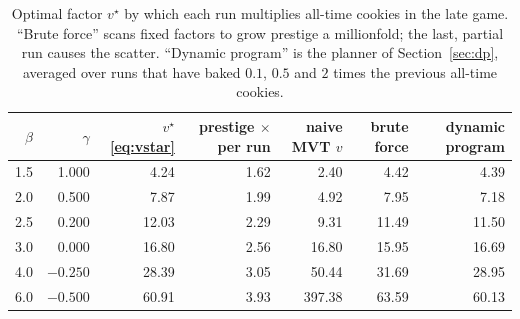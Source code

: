 \documentclass[11pt,a4paper]{article}
\numberwithin{equation}{section}
\theoremstyle{definition}
\theoremstyle{remark}
\begin{document}
\begin{table}[t]
\centering
\small
\begin{tabular}{@{}rrrrrrr@{}}
\toprule
$\beta$ & $\gamma$ & $v^\star$ \eqref{eq:vstar} & prestige $\times$ per run & naive MVT $v$ & brute force & dynamic program \\
\midrule
1.5 & 1.000 & 4.24 & 1.62 & 2.40 & 4.42 & 4.39 \\
2.0 & 0.500 & 7.87 & 1.99 & 4.92 & 7.95 & 7.18 \\
2.5 & 0.200 & 12.03 & 2.29 & 9.31 & 11.49 & 11.50 \\
3.0 & 0.000 & 16.80 & 2.56 & 16.80 & 15.95 & 16.69 \\
4.0 & $-0.250$ & 28.39 & 3.05 & 50.44 & 31.69 & 28.95 \\
6.0 & $-0.500$ & 60.91 & 3.93 & 397.38 & 63.59 & 60.13 \\
\bottomrule
\end{tabular}
\caption{Optimal factor $v^\star$ by which each run multiplies all-time cookies in the late game. ``Brute force'' scans fixed factors to grow prestige a millionfold; the last, partial run causes the scatter. ``Dynamic program'' is the planner of Section~\ref{sec:dp}, averaged over runs that have baked $0.1$, $0.5$ and $2$ times the previous all-time cookies.}
\label{tab:vstar}
\end{table}
\end{document}
